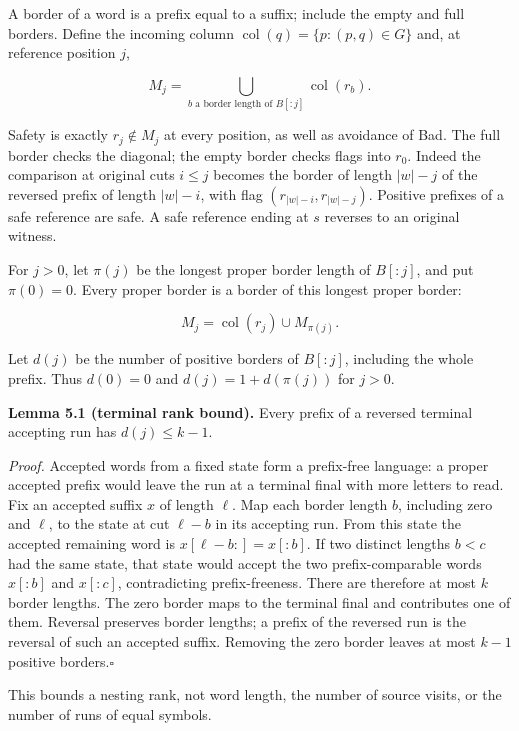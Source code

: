\documentclass[
  11pt,
  a4paper,
]{article}
\begin{document}
A border of a word is a prefix equal to a suffix; include the empty and
full borders. Define the incoming column
\(\operatorname{col}(q)=\{p:(p,q)\in G\}\) and, at reference position
\(j\),

\[M_j=\bigcup_{b\text{ a border length of }B[:j]}\operatorname{col}(r_b).\tag{5.1}\]

Safety is exactly \(r_j\notin M_j\) at every position, as well as
avoidance of Bad. The full border checks the diagonal; the empty border
checks flags into \(r_0\). Indeed the comparison at original cuts
\(i\le j\) becomes the border of length \(|w|-j\) of the reversed prefix
of length \(|w|-i\), with flag \((r_{|w|-i},r_{|w|-j})\). Positive
prefixes of a safe reference are safe. A safe reference ending at \(s\)
reverses to an original witness.

For \(j>0\), let \(\pi(j)\) be the longest proper border length of
\(B[:j]\), and put \(\pi(0)=0\). Every proper border is a border of this
longest proper border:

\[M_j=\operatorname{col}(r_j)\cup M_{\pi(j)}.\tag{5.2}\]

Let \(d(j)\) be the number of positive borders of \(B[:j]\), including
the whole prefix. Thus \(d(0)=0\) and \(d(j)=1+d(\pi(j))\) for \(j>0\).


\textbf{Lemma 5.1 (terminal rank bound).} Every prefix of a reversed
terminal accepting run has \(d(j)\le k-1\).

\emph{Proof.} Accepted words from a fixed state form a prefix-free
language: a proper accepted prefix would leave the run at a terminal
final with more letters to read. Fix an accepted suffix \(x\) of length
\(\ell\). Map each border length \(b\), including zero and \(\ell\), to
the state at cut \(\ell-b\) in its accepting run. From this state the
accepted remaining word is \(x[\ell-b:]=x[:b]\). If two distinct lengths
\(b<c\) had the same state, that state would accept the two
prefix-comparable words \(x[:b]\) and \(x[:c]\), contradicting
prefix-freeness. There are therefore at most \(k\) border lengths. The
zero border maps to the terminal final and contributes one of them.
Reversal preserves border lengths; a prefix of the reversed run is the
reversal of such an accepted suffix. Removing the zero border leaves at
most \(k-1\) positive borders.\nobreak\hspace{.5em}\(\square\)

This bounds a nesting rank, not word length, the number of source
visits, or the number of runs of equal symbols.
\end{document}
